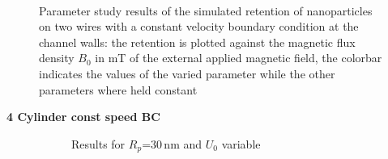 \begin{figure}[H]
\begin{subfigure}{0.49\textwidth}
        \end{subfigure}
        \\       
          \caption[Parameter study results of the simulated retention of nanoparticles on two wires with a constant velocity boundary condition at the channel walls]{Parameter study results of the simulated retention of nanoparticles on two wires with a constant velocity boundary condition at the channel walls: the retention is plotted against the magnetic flux density $B_{0}$ in mT of the external applied magnetic field, the colorbar indicates the values of the varied parameter while the other parameters where held constant}
        \label{fig:tw_param_res_constBC}
  \end{figure}
        
\textbf{4 Cylinder const speed BC}
\begin{figure}[H]
            \begin{subfigure}{0.49\textwidth}
                  \flushleft
                 \caption{Results for $R_{p}$=30\,nm and $U_{0}$ variable}\label{subfig:fw_constBC_U0_var}
          \end{subfigure}\hfill
        \begin{subfigure}{0.49\textwidth}
                \flushright

\end{subfigure}
\end{figure}
